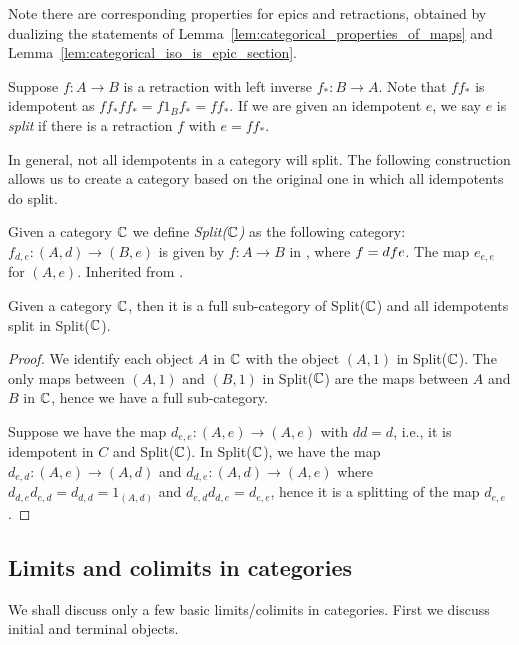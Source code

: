 Note there are corresponding properties for epics and retractions, obtained by dualizing the
statements of Lemma~\ref{lem:categorical_properties_of_maps} and
Lemma~\ref{lem:categorical_iso_is_epic_section}.

Suppose $f:A \to B$ is a retraction with left inverse $f_*:B \to A$. Note that $f f_*$ is idempotent
as $f f_* f f_* = f 1_B f_* = f f_*$. If we are given an idempotent $e$, we say $e$ is \emph{split}
if there is a retraction $f$ with $e = f f_*$.

In general, not all idempotents in a category will split. The following construction allows us to
create a category based on the original one in which all idempotents do split.

\begin{definition}\label{def:split_category}
  Given a category $\mathbb{C}$ we define \emph{Split($\mathbb{C}$)} as the following category:
    {$f_{d,e}:(A,d)\to(B,e)$ is given by $f:A\to B$ in \C, where $f = d\hspace{0.1pt} f e$.}
    {The map $e_{e,e}$ for $(A,e)$.}
    {Inherited from \C.}
\end{definition}

\begin{lemma}\label{lem:split_category_splits_and_has_category}
  Given a category $\mathbb{C}$, then it is a full sub-category of Split($\mathbb{C}$) and all idempotents split
  in Split($\mathbb{C}$).
\end{lemma}
\begin{proof}
  We identify each object $A$ in $\mathbb{C}$ with the object $(A,1)$ in Split($\mathbb{C}$). The only maps between
  $(A,1)$ and $(B,1)$ in Split($\mathbb{C}$) are the maps between $A$ and $B$ in $\mathbb{C}$, hence we have a
  full sub-category.

  Suppose we have the map $d_{e,e}: (A,e) \to (A,e)$ with $d d = d$, i.e., it is idempotent in $C$
  and Split($\mathbb{C}$). In Split($\mathbb{C}$), we have the map $d_{e,d}:(A,e) \to (A,d)$ and $d_{d,e}:(A,d) \to
  (A,e)$ where $d_{d,e} d_{e,d} = d_{d,d} = 1_{(A,d)}$ and $d_{e,d} d_{d,e} = d_{e,e}$, hence
  it is a splitting of the map  $d_{e,e}$.
\end{proof}

\subsection{Limits and colimits in categories} %
\label{sub:limits_and_colimits_in_categories}

We shall discuss only a few basic limits/colimits in categories. First we discuss initial
and terminal objects.

